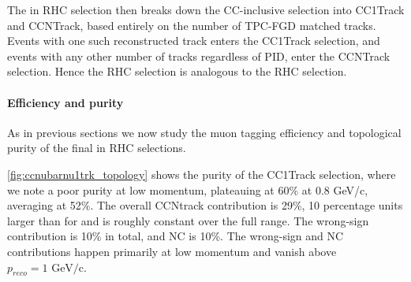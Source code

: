 The \numu in RHC selection then breaks down the CC-inclusive selection into CC1Track and CCNTrack, based entirely on the number of TPC-FGD matched tracks. Events with one such reconstructed track enters the CC1Track selection, and events with any other number of tracks regardless of PID, enter the CCNTrack selection. Hence the \numu RHC selection is analogous to the \numubar RHC selection.

\paragraph{Efficiency and purity}
As in previous sections we now study the muon tagging efficiency and topological purity of the final \numu in RHC selections.

\autoref{fig:ccnubarnu1trk_topology} shows the purity of the CC1Track selection, where we note a poor purity at low momentum, plateauing at 60\% at 0.8 GeV/c, averaging at 52\%. The overall \numu CCNtrack contribution is 29\%, 10 percentage units larger than for \numubar and is roughly constant over the full range. The wrong-sign contribution is 10\% in total, and NC is 10\%. The wrong-sign and NC contributions happen primarily at low momentum and vanish above $p_{reco}=1\text{ GeV/c}$.
